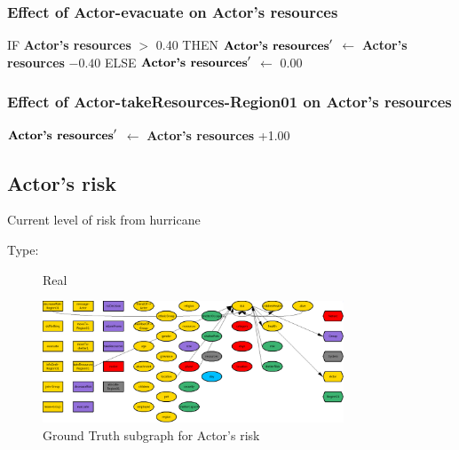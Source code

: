 \documentclass{article}%
\begin{document}
%
\subsubsection{Effect of Actor{-}evacuate on Actor's resources}%
\label{ssubsec:Effect of Actor{-}evacuate on Actor's resources}%
\begin{flushleft}%
IF %
\textbf{Actor's resources}%
$>$%
0.40%
\linebreak%
\hspace*{2em}%
THEN %
$\mbox{\textbf{Actor's resources}} '$%
$\leftarrow$%
\textbf{Actor's resources}%
${-}0.40$%
\linebreak%
\hspace*{2em}%
ELSE %
$\mbox{\textbf{Actor's resources}} '$%
$\leftarrow$%
0.00%
\end{flushleft}

%
\subsubsection{Effect of Actor{-}takeResources{-}Region01 on Actor's resources}%
\label{ssubsec:Effect of Actor{-}takeResources{-}Region01 on Actor's resources}%
\begin{flushleft}%
$\mbox{\textbf{Actor's resources}} '$%
$\leftarrow$%
\textbf{Actor's resources}%
+1.00%
\end{flushleft}

%
\subsection{Actor's risk}%
\label{subsec:Actor's risk}%
Current level of risk from hurricane%
\begin{description}%
\item[Type:]%
Real%
\end{description}%


\begin{figure}[ht]%
\centering%
\includegraphics[width=0.8\textwidth]{images/riskOfActor.png}%
\caption{Ground Truth subgraph for Actor's risk}%
\end{figure}
\end{document}
